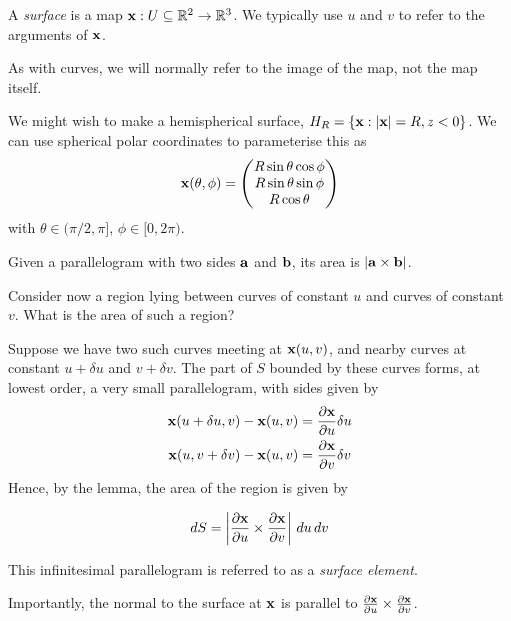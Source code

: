 \documentclass{../../template/note}
\begin{document}
    \begin{definition*}
        A \emph{surface} is a map \(\V x: U \subseteq \RR^2 \to \RR^3\). We typically use \(u\) and \(v\) to refer to the arguments of \(\V x\).
    \end{definition*}
    
    As with curves, we will normally refer to the image of the map, not the map itself.
    
    \begin{example*}
        We might wish to make a hemispherical surface, \(H_R = \{\V x: |\V x| = R, z < 0\}\). We can use spherical polar coordinates to parameterise this as
        \begin{align*}
            \V x(\theta, \phi) = \begin{pmatrix}
             R \sin \theta \cos \phi \\
             R \sin \theta \sin \phi \\
             R \cos \theta  \\
            \end{pmatrix}
        \end{align*}
        with \(\theta \in (\pi/2, \pi]\), \(\phi \in [0, 2\pi)\).
    \end{example*}
    
    \begin{lemma*}
        Given a parallelogram with two sides \(\V a\) and \(\V b\), its area is \(|\V a \times \V b|\).
    \end{lemma*}
    
    Consider now a region lying between curves of constant \(u\) and curves of constant \(v\). What is the area of such a region?

    Suppose we have two such curves meeting at \(\V x(u, v)\), and nearby curves at constant \(u + \delta u\) and \(v + \delta v\). The part of \(S\) bounded by these curves forms, at lowest order, a very small parallelogram, with sides given by
    \begin{align*}
        \V x(u + \delta u, v) - \V x(u, v) &= \pd{\V x}{u}\delta u \\
        \V x(u, v + \delta v) - \V x(u, v) &= \pd{\V x}{v}\delta v 
    \end{align*}
    Hence, by the lemma, the area of the region is given by
    \begin{proposition}
        \label{4.4} \[
            dS = \left|\pd{\V x}{u} \times \pd{\V x}{v}\right|\D u \D v
        \]
    \end{proposition}
    This infinitesimal parallelogram is referred to as a \emph{surface element}.
    \begin{remark*}
        Importantly, the normal to the surface at \(\V x\) is parallel to \(\pd{\V x}{u} \times \pd{\V x}{v}\).
    \end{remark*}
    
\end{document}
